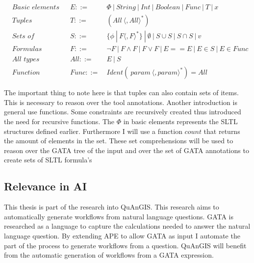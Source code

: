 \documentclass{article}
\begin{document}
\begin{align}
&\textit{Basic elements}  & E::=&\ \Phi\ |\ String\ |\ Int\ |\ Boolean\ |\ Func\ |\ T \ |\ x \nonumber  \\
&\textit{Tuples} & T::=&\ ( All\ \langle,All\rangle^*)  \nonumber
\\
    &\textit{Sets of formulas}  & S ::=&\ \{\phi\ |\ F\langle,F\rangle^* \}\ |\ \emptyset\ |\ S \cup S\ |\ S\cap S\ |\ v    \nonumber\\
    &Formulas & F ::=&\ \neg F \ |\ F \wedge F\ |\ F \vee F\ |\ E == E \ |\ E \in S \ |\ E \in Func \nonumber \\
    &\textit{All types} & All ::=&\ E\ |\ S\ \nonumber\\
    &\textit{Function} & Func ::=&\ Ident( \ param\ \langle,param\rangle^*) = All \label{eq:setcomprehensionbnf}
\end{align}

The important thing to note here is that tuples can also contain sets of items. This is necessary to reason over the tool annotations. Another introduction is general use functions. Some constraints are recursively created thus introduced the need for recursive functions. The $\Phi$ in basic elements represents the SLTL structures defined earlier. Furthermore I will use a function $count$ that returns the amount of elements in the set. These set comprehensions will be used to reason over the GATA tree of the input and over the set of GATA annotations to create sets of SLTL formula's






\subsection{Relevance in AI}
This thesis is part of the research into QuAnGIS. This research aims to automatically generate workflows from natural language questions. GATA is researched as a language to capture the calculations needed to answer the natural language question. By extending APE to allow GATA as input I automate the part of the process to generate workflows from a question. QuAnGIS will benefit from the automatic generation of workflows from a GATA expression. 
\end{document}
